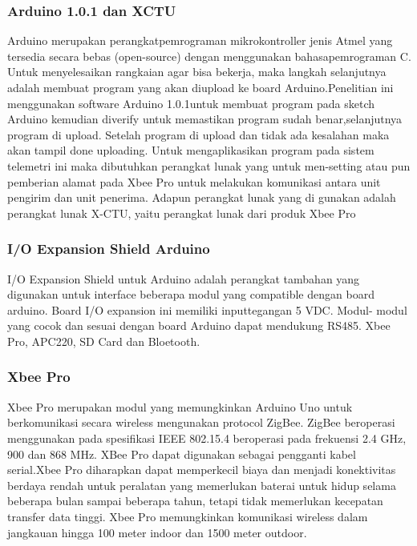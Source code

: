 \subsubsection {Arduino 1.0.1 dan XCTU}
Arduino merupakan perangkatpemrograman mikrokontroller jenis Atmel yang tersedia secara bebas (open-source)
dengan menggunakan bahasapemrograman C. Untuk menyelesaikan rangkaian agar bisa bekerja, maka langkah selanjutnya adalah membuat program yang
akan diupload ke board Arduino.Penelitian ini menggunakan software Arduino 1.0.1untuk membuat program pada sketch Arduino kemudian diverify
untuk memastikan program sudah benar,selanjutnya program di upload. Setelah program di upload dan tidak ada kesalahan
maka akan tampil done uploading. Untuk mengaplikasikan program pada sistem telemetri ini maka dibutuhkan perangkat lunak yang untuk men-setting atau pun pemberian alamat pada Xbee Pro untuk melakukan komunikasi antara unit pengirim dan unit penerima. Adapun
perangkat lunak yang di gunakan adalah perangkat lunak X-CTU, yaitu perangkat lunak dari produk Xbee Pro

\subsubsection  {I/O Expansion Shield Arduino}
I/O Expansion Shield untuk Arduino adalah perangkat tambahan yang digunakan untuk interface beberapa modul yang compatible dengan board arduino. Board I/O expansion ini memiliki inputtegangan 5 VDC. Modul- modul yang cocok dan sesuai dengan board Arduino dapat mendukung RS485. Xbee Pro, APC220, SD Card dan Bloetooth.

\subsubsection {Xbee Pro}
Xbee Pro merupakan modul yang memungkinkan Arduino Uno untuk berkomunikasi secara wireless
mengunakan protocol ZigBee. ZigBee beroperasi menggunakan pada spesifikasi IEEE 802.15.4 beroperasi pada frekuensi
2.4 GHz, 900 dan 868 MHz. XBee Pro dapat digunakan sebagai pengganti kabel serial.Xbee Pro diharapkan dapat memperkecil biaya dan menjadi
konektivitas berdaya rendah untuk peralatan yang memerlukan baterai untuk hidup selama beberapa bulan sampai beberapa tahun, tetapi tidak memerlukan kecepatan transfer data tinggi. Xbee Pro memungkinkan komunikasi wireless dalam jangkauan hingga 100 meter indoor dan 1500 meter outdoor.

